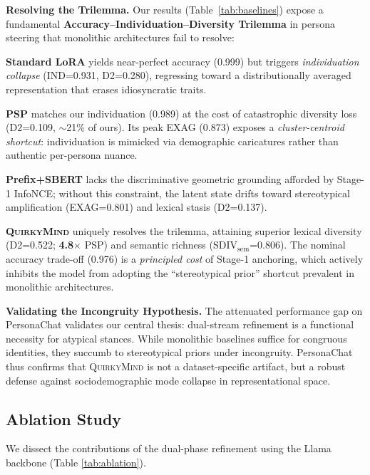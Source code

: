 \noindent\textbf{Resolving the Trilemma.} 
Our results (Table~\ref{tab:baselines}) expose a fundamental \textbf{Accuracy--Individuation--Diversity Trilemma} in persona steering that monolithic architectures fail to resolve:

\noindent \textbf{Standard LoRA} yields near-perfect accuracy (0.999) but triggers \textit{individuation collapse} (IND=0.931, D2=0.280), regressing toward a distributionally averaged representation that erases idiosyncratic traits.

\noindent \textbf{PSP} \citep{tan2024democratizing} matches our individuation (0.989) at the cost of catastrophic diversity loss (D2=0.109, $\sim$21\% of ours). Its peak EXAG (0.873) exposes a \textit{cluster-centroid shortcut}: individuation is mimicked via demographic caricatures rather than authentic per-persona nuance.

\noindent \textbf{Prefix+SBERT} lacks the discriminative geometric grounding afforded by Stage-1 InfoNCE; without this constraint, the latent state drifts toward stereotypical amplification (EXAG=0.801) and lexical stasis (D2=0.137).

\noindent \textbf{\textsc{QuirkyMind}} uniquely resolves the trilemma, attaining superior lexical diversity (D2=0.522; \textbf{4.8$\times$} PSP) and semantic richness (SDIV$_{\text{sem}}$=0.806). The nominal accuracy trade-off (0.976) is a \textit{principled cost} of Stage-1 anchoring, which actively inhibits the model from adopting the ``stereotypical prior'' shortcut prevalent in monolithic architectures.

    

\noindent\textbf{Validating the Incongruity Hypothesis.}
The attenuated performance gap on PersonaChat validates our central thesis: dual-stream refinement is a functional necessity for atypical stances. While monolithic baselines suffice for congruous identities, they succumb to stereotypical priors under incongruity. PersonaChat thus confirms that \textsc{QuirkyMind} is not a dataset-specific artifact, but a robust defense against sociodemographic mode collapse in representational space.







\subsection{Ablation Study}\label{sec:rq3}
We dissect the contributions of the dual-phase refinement using the Llama backbone (Table \ref{tab:ablation}).


